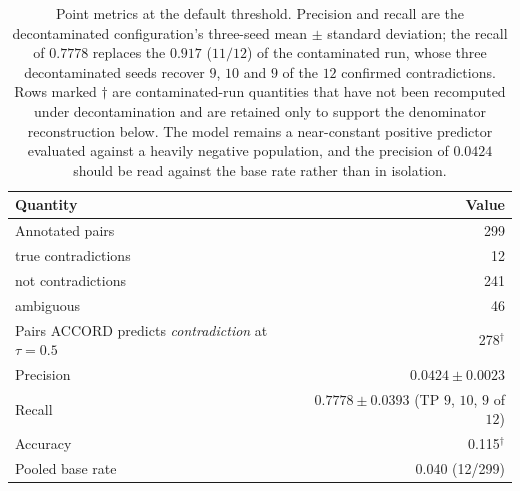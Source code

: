 \begin{table}[t]
\centering
\small
\begin{tabular}{lr}
\toprule
\textbf{Quantity} & \textbf{Value} \\
\midrule
Annotated pairs                                   & 299 \\
\quad true contradictions                         & 12 \\
\quad not contradictions                          & 241 \\
\quad ambiguous                                   & 46 \\
\midrule
Pairs ACCORD predicts \emph{contradiction} at $\tau = 0.5$ & 278$^{\dagger}$ \\
\midrule
Precision                                         & $0.0424 \pm 0.0023$ \\
Recall                                            & $0.7778 \pm 0.0393$ (TP $9$, $10$, $9$ of $12$) \\
Accuracy                                          & 0.115$^{\dagger}$ \\
Pooled base rate                                  & 0.040 (12/299) \\
\bottomrule
\end{tabular}
\caption{Point metrics at the default threshold. Precision and recall are the
decontaminated configuration's three-seed mean $\pm$ standard deviation; the
recall of $0.7778$ replaces the $0.917$ ($11/12$) of the contaminated run, whose
three decontaminated seeds recover $9$, $10$ and $9$ of the $12$ confirmed
contradictions. Rows marked $\dagger$ are contaminated-run quantities that have
not been recomputed under decontamination and are retained only to support the
denominator reconstruction below. The model remains a near-constant positive
predictor evaluated against a heavily negative population, and the precision of
$0.0424$ should be read against the base rate rather than in isolation.}
\label{tab:point}
\end{table}

